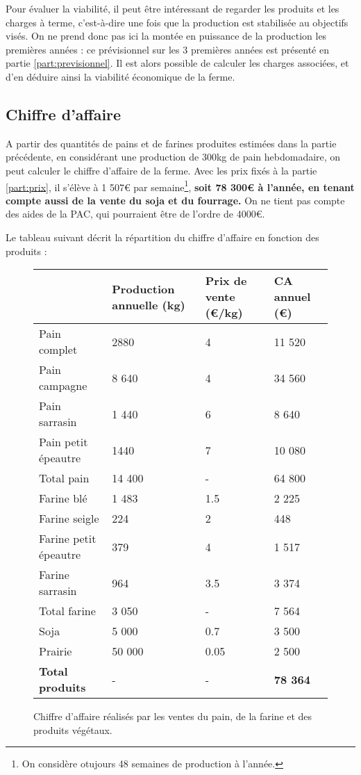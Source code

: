 \documentclass{book}
\begin{document}
Pour évaluer la viabilité, il peut être intéressant de regarder les produits et les charges à terme, c'est-à-dire une fois que la production est stabilisée au objectifs visés. On ne prend donc pas ici la montée en puissance de la production les premières années : ce prévisionnel sur les 3 premières années est présenté en partie \ref{part:previsionnel}. Il est alors possible de calculer les charges associées, et d'en déduire ainsi la viabilité économique de la ferme.

\subsection{Chiffre d'affaire}

A partir des quantités de pains et de farines produites estimées dans la partie précédente, en considérant une production de 300kg de pain hebdomadaire, on peut calculer le chiffre d'affaire de la ferme. Avec les prix fixés à la partie \ref{part:prix}, il s'élève à 1 507\euro{} par semaine\footnote{On considère otujours 48 semaines de production à l'année.}, \textbf{soit 78 300\euro{} à l'année, en tenant compte aussi de la vente du soja et du fourrage.} On ne tient pas compte des aides de la PAC, qui pourraient être de l'ordre de 4000\euro{}.

Le tableau suivant décrit la répartition du chiffre d'affaire en fonction des produits : 
\begin{figure}[h!]
\footnotesize
\center
\begin{tabular}{ | p{3cm} | p{2cm}| p{} |p{2cm}| }
\hline
	& Production annuelle (kg) & Prix de vente (\euro{}/kg) & CA annuel (\euro{})  \\ \hline
	Pain complet & 2880 & 4 & 11 520 \\ 
	Pain campagne & 8 640 & 4 & 34 560 \\ 
	Pain sarrasin & 1 440 & 6 & 8 640 \\
	Pain petit épeautre & 1440 & 7 & 10 080 \\ \hline
	Total pain & 14 400 & - & 64 800 \\ \hline
	\hline
	Farine blé & 1 483 & 1.5 & 2 225 \\
	Farine seigle & 224 & 2 & 448 \\ 
	Farine petit épeautre & 379 & 4 & 1 517 \\ 
	Farine sarrasin & 964 & 3.5 & 3 374 \\ \hline
	Total farine & 3 050 & - & 7 564 \\ \hline
	\hline
	Soja & 5 000 & 0.7 & 3 500 \\ 
	Prairie & 50 000 & 0.05 & 2 500 \\ \hline
	\hline
	\textbf{Total produits} & - & - & \textbf{78 364} \\ \hline
\end{tabular}
\caption{Chiffre d'affaire réalisés par les ventes du pain, de la farine et des produits végétaux.}
\label{tab:CA}
\end{figure}
\end{document}
